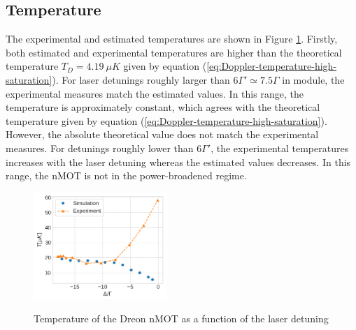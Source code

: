 \subsection{Temperature}
\label{temperature}

The experimental and estimated temperatures are shown in Figure \ref{fig:Dreon-temperature}. Firstly, both estimated and experimental temperatures are higher than the theoretical temperature $ T_D = 4.19\ \mu K $ given by equation (\ref{eq:Doppler-temperature-high-saturation}). For laser detunings roughly larger than $ 6 \Gamma' \simeq 7.5 \Gamma $ in module, the experimental measures match the estimated values. In this range, the temperature is approximately constant, which agrees with the theoretical temperature given by equation (\ref{eq:Doppler-temperature-high-saturation}). However, the absolute theoretical value does not match the experimental measures. For detunings roughly lower than $ 6 \Gamma' $, the experimental temperatures increases with the laser detuning whereas the estimated values decreases. In this range, the nMOT is not in the power-broadened regime.

\begin{figure}[!ht]
    \centering
    \caption{Temperature of the Dreon nMOT as a function of the laser detuning}
    \includegraphics[width=0.45\textwidth]{USPSC-img/dy_temperature.png}
    \vspace{5px}
    \label{fig:Dreon-temperature}
\end{figure}
